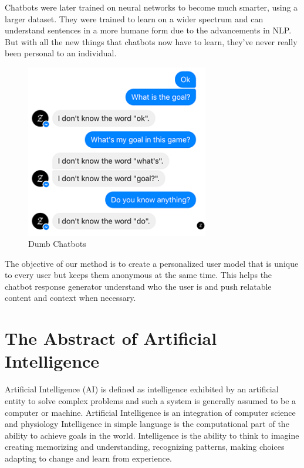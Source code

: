 Chatbots were later trained on neural networks to become much smarter, using a larger dataset. They were trained to learn on a wider spectrum and can understand sentences in a more humane form due to the advancements in NLP. But with all the new things that chatbots now have to learn, they’ve never really been personal to an individual.

\begin{figure}[H]
    \centering
    \includegraphics[width=8cm]{images/dumb-chatbot.png}
    \caption{Dumb Chatbots}
    \label{fig:dumb-chatbot}
\end{figure}

The objective of our method is to create a personalized user model that is unique to every user but keeps them anonymous at the same time. This helps the chatbot response generator understand who the user is and push relatable content and context when necessary.

\pagebreak

\section{The Abstract of Artificial Intelligence}

Artificial Intelligence (AI) is defined as intelligence exhibited by an artificial entity to solve complex problems and such a system is generally assumed to be a computer or machine. Artificial Intelligence is an integration of computer science and physiology Intelligence in simple language is the computational part of the ability to achieve goals in the world. Intelligence is the ability to think to imagine creating memorizing and understanding, recognizing patterns, making choices adapting to change and learn from experience.

